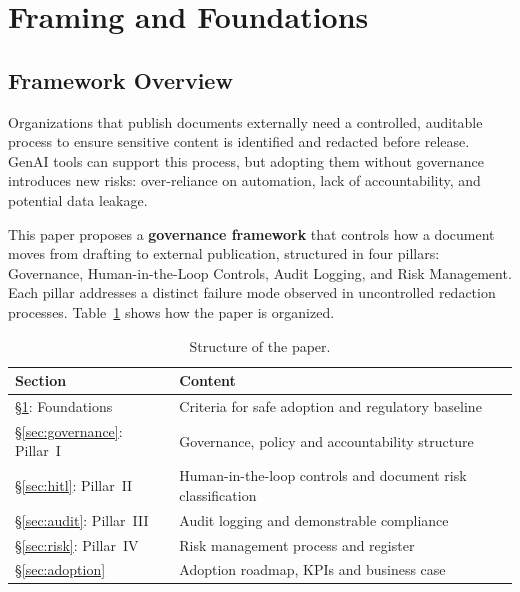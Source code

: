 \documentclass[12pt,a4paper]{article}
\begin{document}
\newpage

\tableofcontents
\newpage

\section{Framing and Foundations}
\label{sec:foundations}

\subsection{Framework Overview}

Organizations that publish documents externally need a controlled, auditable process to ensure sensitive content is identified and redacted before release. GenAI tools can support this process, but adopting them without governance introduces new risks: over-reliance on automation, lack of accountability, and potential data leakage.

This paper proposes a \textbf{governance framework} that controls how a document moves from drafting to external publication, structured in four pillars: Governance, Human-in-the-Loop Controls, Audit Logging, and Risk Management. Each pillar addresses a distinct failure mode observed in uncontrolled redaction processes. Table~\ref{tab:structure} shows how the paper is organized.

\begin{table}[h!]
\centering
\small
{}
\begin{tabular}{@{} p{4.8cm} p{9cm} @{}}
\toprule
\textbf{\color{accentdark}Section} & \textbf{\color{accentdark}Content} \\
\midrule
\S\ref{sec:foundations}: Foundations & Criteria for safe adoption and regulatory baseline \\
\S\ref{sec:governance}: Pillar~I & Governance, policy and accountability structure \\
\S\ref{sec:hitl}: Pillar~II & Human-in-the-loop controls and document risk classification \\
\S\ref{sec:audit}: Pillar~III & Audit logging and demonstrable compliance \\
\S\ref{sec:risk}: Pillar~IV & Risk management process and register \\
\S\ref{sec:adoption} & Adoption roadmap, KPIs and business case \\
\bottomrule
\end{tabular}
\caption{Structure of the paper.}
\label{tab:structure}
\end{table}
\end{document}
